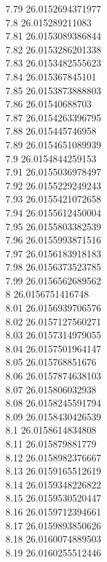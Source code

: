 {7.79	26.0152694371977\\
7.8	26.015289211083\\
7.81	26.0153089386844\\
7.82	26.0153286201338\\
7.83	26.0153482555623\\
7.84	26.015367845101\\
7.85	26.0153873888803\\
7.86	26.01540688703\\
7.87	26.0154263396795\\
7.88	26.015445746958\\
7.89	26.0154651089939\\
7.9	26.0154844259153\\
7.91	26.0155036978497\\
7.92	26.0155229249243\\
7.93	26.0155421072658\\
7.94	26.0155612450004\\
7.95	26.0155803382539\\
7.96	26.0155993871516\\
7.97	26.0156183918183\\
7.98	26.0156373523785\\
7.99	26.0156562689562\\
8	26.0156751416748\\
8.01	26.0156939706576\\
8.02	26.0157127560271\\
8.03	26.0157314979055\\
8.04	26.0157501964147\\
8.05	26.015768851676\\
8.06	26.0157874638103\\
8.07	26.015806032938\\
8.08	26.0158245591794\\
8.09	26.0158430426539\\
8.1	26.0158614834808\\
8.11	26.015879881779\\
8.12	26.0158982376667\\
8.13	26.0159165512619\\
8.14	26.0159348226822\\
8.15	26.0159530520447\\
8.16	26.0159712394661\\
8.17	26.0159893850626\\
8.18	26.0160074889503\\
8.19	26.0160255512446\\
}
